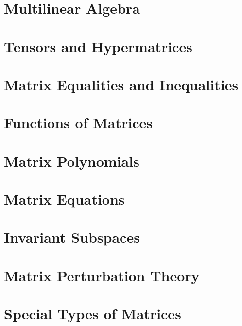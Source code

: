 \documentclass[a4paper]{article}
\begin{document}
\section{Multilinear Algebra}

\section{Tensors and Hypermatrices}

\section{Matrix Equalities and Inequalities}

\section{Functions of Matrices}

\section{Matrix Polynomials}

\section{Matrix Equations}

\section{Invariant Subspaces}

\section{Matrix Perturbation Theory}

\section{Special Types of Matrices}
\end{document}
